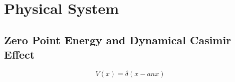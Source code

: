 \chapter{Physical System}\label{ch:system}


\section{Zero Point Energy and Dynamical Casimir Effect}

\begin{equation} %
	V(x) = \delta(x-anx)
\end{equation}

